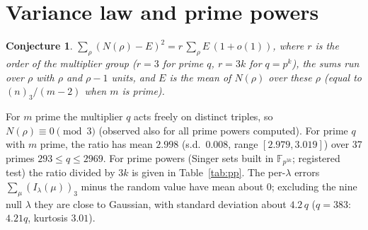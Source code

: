 \documentclass[11pt]{article}
\newtheorem{conjecture}{Conjecture}
\begin{document}
\section{Variance law and prime powers}
\begin{conjecture}\label{conj:var}
$\sum_{\rho}(N(\rho)-E)^2=r\,\sum_\rho E\,(1+o(1))$, where $r$ is the order of the multiplier group ($r=3$ for prime $q$, $r=3k$ for
$q=p^k$), the sums run over $\rho$ with $\rho$ and $\rho-1$ units, and $E$ is the mean of $N(\rho)$ over these $\rho$
(equal to $(n)_3/(m-2)$ when $m$ is prime).
\end{conjecture}
For $m$ prime the multiplier $q$ acts freely on distinct triples, so $N(\rho)\equiv0\pmod3$ (observed also for all prime powers
computed). For prime $q$ with $m$ prime, the ratio has mean $2.998$ (s.d.\ $0.008$, range $[2.979,3.019]$) over 37 primes
$293\le q\le2969$. For prime powers (Singer sets built in $\mathbb F_{p^{3k}}$; registered test) the ratio divided by $3k$ is given in
Table~\ref{tab:pp}. The per-$\lambda$ errors $\sum_\mu(I_\lambda(\mu))_3$ minus the random value have mean about $0$; excluding the nine
null $\lambda$ they are close to Gaussian, with standard deviation about $4.2\,q$ ($q=383$: $4.21q$, kurtosis $3.01$).
\end{document}
